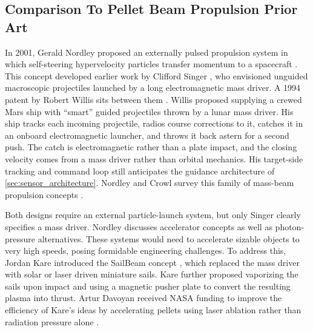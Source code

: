 \documentclass{article}
\begin{document}
\subsection{Comparison To Pellet Beam Propulsion Prior Art}\label{sec:pellet_prior_art}
In 2001, Gerald Nordley proposed an externally pulsed propulsion system in which self-steering hypervelocity particles transfer momentum to a spacecraft \cite{nordley2001interstellar}. This concept developed earlier work by Clifford Singer \cite{singer1979interstellar}, who envisioned unguided macroscopic projectiles launched by a long electromagnetic mass driver. A 1994 patent by Robert Willis sits between them \cite{willis1994momentum}. Willis proposed supplying a crewed Mars ship with ``smart'' guided projectiles thrown by a lunar mass driver. His ship tracks each incoming projectile, radios course corrections to it, catches it in an onboard electromagnetic launcher, and throws it back astern for a second push. The catch is electromagnetic rather than a plate impact, and the closing velocity comes from a mass driver rather than orbital mechanics. His target-side tracking and command loop still anticipates the guidance architecture of \autoref{sec:sensor_architecture}. Nordley and Crowl survey this family of mass-beam propulsion concepts \cite{nordley2015massbeam}.

Both designs require an external particle-launch system, but only Singer clearly specifies a mass driver. Nordley discusses accelerator concepts as well as photon-pressure alternatives. These systems would need to accelerate sizable objects to very high speeds, posing formidable engineering challenges. To address this, Jordan Kare introduced the SailBeam concept \cite{kare2001sailbeam}, which replaced the mass driver with solar or laser driven miniature sails. Kare further proposed vaporizing the sails upon impact and using a magnetic pusher plate to convert the resulting plasma into thrust.   Artur Davoyan received NASA funding to improve the efficiency of Kare's ideas by accelerating pellets using laser ablation rather than radiation pressure alone \cite{davoyan2023pelletbeam}.
\end{document}
